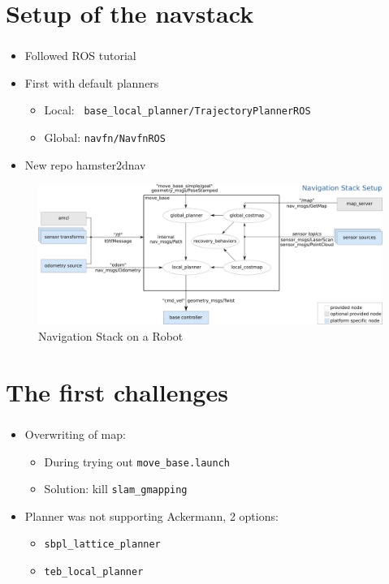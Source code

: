 \documentclass[numberofslides]{AMSBeamer}
\begin{document}
\section{Setup of the navstack}
\begin{frame}[label=agenda]
	\frametitle{\insertsectionhead}%
        \begin{itemize}
        \item Followed ROS tutorial
        \item First with default planners
            \begin{itemize}
                \item Local: \ \texttt{base\_local\_planner/TrajectoryPlannerROS}
                \item Global: \texttt{navfn/NavfnROS}
            \end{itemize}
        \item New repo hamster\textunderscore2dnav
    \end{itemize}

        \begin{figure}
                \centering
                \includegraphics[width=0.7\linewidth]{Presentations/LaTeX/images/nav_stack_tutorial.png}
                \caption{Navigation Stack on a Robot}
                \label{fig:enter-label}
        \end{figure}
\end{frame}

\section{The first challenges}
\begin{frame}[label=agenda]
	\frametitle{\insertsectionhead}%
\begin{itemize}
  \item Overwriting of map:
  \begin{itemize}
    \item During trying out \texttt{move\_base.launch}
    \item Solution: kill \texttt{slam\_gmapping}
  \end{itemize}
  \item Planner was not supporting Ackermann, 2 options:
  \begin{itemize}
    \item \texttt{sbpl\_lattice\_planner}
    \item \texttt{teb\_local\_planner}
  \end{itemize}
\end{itemize}

\end{frame}
\end{document}
